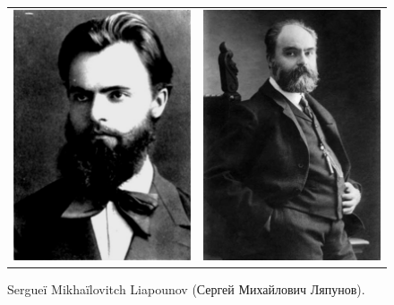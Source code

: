 \begin{figure}[!p]
  \begin{bigcenter}
    \begin{tabular}{lr}
      \includegraphics[width=7cm, keepaspectratio]{lyapunov-1.jpg}
      &
      \includegraphics[width=7cm, keepaspectratio]{lyapunov-2.jpg}
    \end{tabular}
  \end{bigcenter}
  \caption{\label{liapounov1}Sergueï Mikhaïlovitch Liapounov (\foreignlanguage{russian}{Сергей Михайлович Ляпунов}).}
\end{figure}

